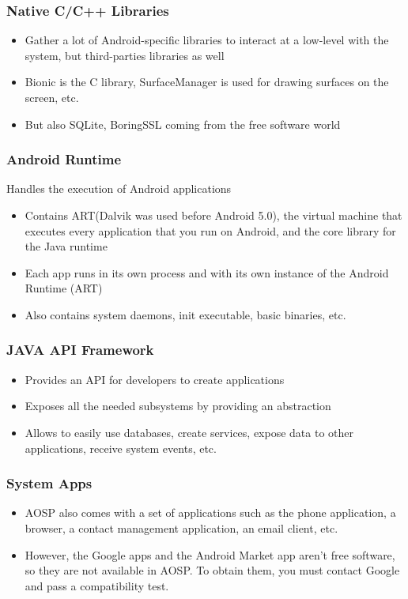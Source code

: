 \begin{frame}
  \frametitle{Native C/C++ Libraries}
  \begin{itemize}
  \item Gather a lot of Android-specific libraries to interact at a
    low-level with the system, but third-parties libraries as well
  \item Bionic is the C library, SurfaceManager is used for drawing
    surfaces on the screen, etc.
  \item But also SQLite, BoringSSL coming from the free software
    world
  \end{itemize}
\end{frame}

\begin{frame}
  \frametitle{Android Runtime}
  Handles the execution of Android applications
  \begin{itemize}
  \item Contains ART(Dalvik was used before Android 5.0), the virtual machine that executes every
    application that you run on Android, and the core library for the
    Java runtime
  \item Each app runs in its own process and with its own instance of the Android Runtime (ART)
  \item Also contains system daemons, init executable, basic binaries,
    etc.
  \end{itemize}
\end{frame}

\begin{frame}
  \frametitle{JAVA API Framework}
  \begin{itemize}
  \item Provides an API for developers to create applications
  \item Exposes all the needed subsystems by providing an abstraction
  \item Allows to easily use databases, create services, expose data
    to other applications, receive system events, etc.
  \end{itemize}
\end{frame}

\begin{frame}
  \frametitle{System Apps}
  \begin{itemize}
  \item AOSP also comes with a set of applications such as the phone
    application, a browser, a contact management application, an email
    client, etc.
  \item However, the Google apps and the Android Market app aren't free
    software, so they are not available in AOSP. To obtain them, you
    must contact Google and pass a compatibility test.
  \end{itemize}
\end{frame}
